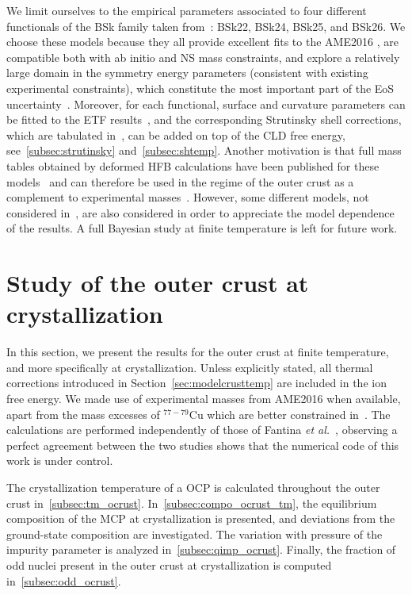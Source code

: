 We limit ourselves to the empirical parameters 
associated to four different functionals of the BSk family taken 
from~\cite{Goriely2013}: BSk22, BSk24, BSk25, and BSk26.
We choose these models because they all provide excellent fits to the 
AME2016 \cite{Huang2017}, are compatible both with ab initio and NS mass 
constraints, and explore a relatively large domain in the symmetry energy 
parameters (consistent with existing experimental constraints), which 
constitute the most important part of the EoS 
uncertainty~\cite{Pearson2014,Pearson2018}. Moreover, for each functional, 
surface and curvature parameters can be fitted to the ETF 
results~\cite{Pearson2019}, and the corresponding Strutinsky shell corrections, 
which are tabulated in~\cite{Pearson2018}, can be added on top of the CLD free 
energy, see~\ref{subsec:strutinsky} and~\ref{subsec:shtemp}.
Another motivation is that full mass tables obtained by deformed HFB 
calculations have been published for these models~\cite{Xu2013} and can 
therefore be used in the regime of the outer crust as a
complement to experimental masses~\cite{Fantina2020}. 
However, some different models, not considered in~\cite{Fantina2020}, are also
considered in order to appreciate the model dependence of the results. A full
Bayesian study at finite temperature is left for future work.

\section{Study of the outer crust at crystallization}\label{sec:ocrust_tm}

In this section, we present the results for the outer crust at finite
temperature, and more specifically at crystallization.
Unless explicitly stated, all thermal corrections introduced in
Section~\ref{sec:modelcrusttemp} are included in the ion free energy.
We made use of experimental masses from AME2016 \cite{Huang2017} when 
available, apart from the mass excesses of $^{77-79}$Cu which are better 
constrained in~\cite{Welker2017}.
{The calculations are performed independently of those 
  of Fantina \textit{et al.}~\cite{Fantina2020}, observing a perfect 
  agreement between the two studies shows that the numerical code of this 
  work is under control.}

The crystallization temperature of a OCP is calculated throughout the outer
crust in~\ref{subsec:tm_ocrust}. In~\ref{subsec:compo_ocrust_tm}, the
equilibrium composition of the MCP at crystallization is presented, and 
deviations from the ground-state composition are investigated. The variation 
with pressure of the impurity parameter is analyzed 
in~\ref{subsec:qimp_ocrust}. Finally, the fraction of odd nuclei present in the 
outer crust at crystallization is computed in~\ref{subsec:odd_ocrust}.

